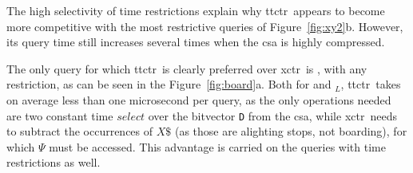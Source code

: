     The high selectivity of time restrictions explain why \gls{ttctr}~appears to become more competitive with the most restrictive queries of Figure~\ref{fig:xy2}b. However, its query time still increases several times when the \gls{csa} is highly compressed.
    
    The only query for which \gls{ttctr}~is clearly preferred over \gls{xctr}~is \texttt{\boardX}, with any restriction, as can be seen in the Figure~\ref{fig:board}a. Both for \texttt{\boardX} and \texttt{\boardX$_{L}$}, \gls{ttctr}~takes on average less than one microsecond per query, as the only operations needed are two constant time $select$ over the bitvector \texttt{D} from the \gls{csa}, while \gls{xctr}~needs to subtract the occurrences of $X\$$ (as those are alighting stops, not boarding), for which $\Psi$ must be accessed. This advantage is carried on the queries with time restrictions as well.
    
